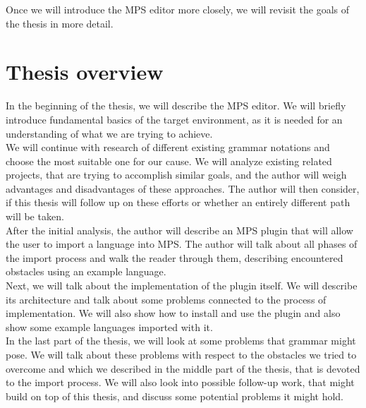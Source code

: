 Once we will introduce the MPS editor more closely, we will revisit the goals of the thesis in more detail.

\section{Thesis overview}

In the beginning of the thesis, we will describe the MPS editor.
We will briefly introduce fundamental basics of the target environment, as it is needed for an understanding of what we are trying to achieve.
\\

We will continue with research of different existing grammar notations and choose the most suitable one for our cause.
We will analyze existing related projects, that are trying to accomplish similar goals, and the author will weigh advantages and disadvantages of these approaches.
The author will then consider, if this thesis will follow up on these efforts or whether an entirely different path will be taken.
\\

After the initial analysis, the author will describe an MPS plugin that will allow the user to import a language into MPS.
The author will talk about all phases of the import process and walk the reader through them, describing encountered obstacles using an example language.
\\

Next, we will talk about the implementation of the plugin itself.
We will describe its architecture and talk about some problems connected to the process of implementation.
We will also show how to install and use the plugin and also show some example languages imported with it.
\\

In the last part of the thesis, we will look at some problems that grammar might pose.
We will talk about these problems with respect to the obstacles we tried to overcome and which we described in the middle part of the thesis, that is devoted to the import process.
We will also look into possible follow-up work, that might build on top of this thesis, and discuss some potential problems it might hold.
